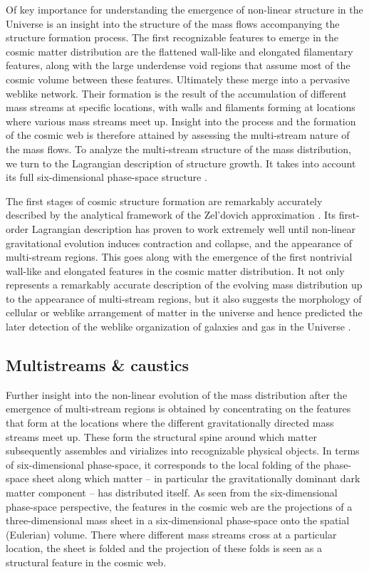 \documentclass[a4paper, 11pt]{article}
\begin{document}
Of key importance for understanding the emergence of non-linear structure in the Universe is an insight into the structure of the mass flows accompanying the structure formation process. The first recognizable features to emerge in the cosmic matter distribution are the flattened wall-like and elongated filamentary features, along with the large underdense void regions that assume most of the cosmic volume between these features. Ultimately these merge into a pervasive weblike network. Their formation is the result of the accumulation of different mass streams at specific locations, with walls and filaments forming at locations where various mass streams meet up.  Insight into the process and the formation of the cosmic web is therefore attained by assessing the multi-stream nature of the mass flows. To analyze the multi-stream structure of the mass distribution, we turn to the Lagrangian description of structure growth. It takes into account its full six-dimensional phase-space structure \cite[see][for key contributions on this.]{Shandarin:2010,Shandarin:2011,Shandarin:2012,Abel:2012,Falck:2012}. 

The first stages of cosmic structure formation are remarkably accurately described by the analytical framework of the Zel'dovich approximation \cite{Zeldovich:1970}. Its first-order Lagrangian description has proven to work extremely well until non-linear gravitational evolution induces contraction and collapse, and the appearance of multi-stream regions. This goes along with the emergence of the first nontrivial wall-like and elongated features in the cosmic matter distribution. It not only represents a remarkably accurate description of the evolving mass distribution up to the appearance of multi-stream regions, but it also suggests the morphology of cellular or weblike arrangement of matter in the universe and hence predicted the later detection of the weblike organization of galaxies and gas in the Universe \cite{ Einasto:1978, Lapparent:1986, Colless:2003, Huchra:2012, Granett:2012}. 

\subsection{Multistreams \& caustics}
Further insight into the non-linear evolution of the mass distribution after the emergence of multi-stream regions is obtained by concentrating on the features that form at the locations where the different gravitationally directed mass streams meet up. These form the structural spine around which matter subsequently assembles and virializes into recognizable physical objects. In terms of six-dimensional phase-space, it corresponds to the local folding of the phase-space sheet along which matter -- in particular the gravitationally dominant dark matter component -- has distributed itself. As seen from the six-dimensional phase-space perspective, the features in the cosmic web are the projections of a three-dimensional mass sheet in a six-dimensional phase-space onto the spatial (Eulerian) volume. There where different mass streams cross at a particular location, the sheet is folded and the projection of these folds is seen as a structural feature in the cosmic web.
\end{document}
